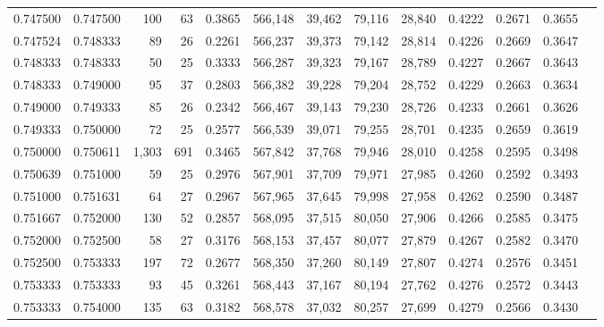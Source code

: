 \begin{tabular}{rrrrrrrrrrrrr}
0.747500 & 0.747500 &   100 &  63 &                                     0.3865 & 566,148 &  39,462 &  79,116 &  28,840 & 0.4222 & 0.2671 & 0.3655 \\
0.747524 & 0.748333 &    89 &  26 &                                     0.2261 & 566,237 &  39,373 &  79,142 &  28,814 & 0.4226 & 0.2669 & 0.3647 \\
0.748333 & 0.748333 &    50 &  25 &                                     0.3333 & 566,287 &  39,323 &  79,167 &  28,789 & 0.4227 & 0.2667 & 0.3643 \\
0.748333 & 0.749000 &    95 &  37 &                                     0.2803 & 566,382 &  39,228 &  79,204 &  28,752 & 0.4229 & 0.2663 & 0.3634 \\
0.749000 & 0.749333 &    85 &  26 &                                     0.2342 & 566,467 &  39,143 &  79,230 &  28,726 & 0.4233 & 0.2661 & 0.3626 \\
0.749333 & 0.750000 &    72 &  25 &                                     0.2577 & 566,539 &  39,071 &  79,255 &  28,701 & 0.4235 & 0.2659 & 0.3619 \\
0.750000 & 0.750611 & 1,303 & 691 &                                     0.3465 & 567,842 &  37,768 &  79,946 &  28,010 & 0.4258 & 0.2595 & 0.3498 \\
0.750639 & 0.751000 &    59 &  25 &                                     0.2976 & 567,901 &  37,709 &  79,971 &  27,985 & 0.4260 & 0.2592 & 0.3493 \\
0.751000 & 0.751631 &    64 &  27 &                                     0.2967 & 567,965 &  37,645 &  79,998 &  27,958 & 0.4262 & 0.2590 & 0.3487 \\
0.751667 & 0.752000 &   130 &  52 &                                     0.2857 & 568,095 &  37,515 &  80,050 &  27,906 & 0.4266 & 0.2585 & 0.3475 \\
0.752000 & 0.752500 &    58 &  27 &                                     0.3176 & 568,153 &  37,457 &  80,077 &  27,879 & 0.4267 & 0.2582 & 0.3470 \\
0.752500 & 0.753333 &   197 &  72 &                                     0.2677 & 568,350 &  37,260 &  80,149 &  27,807 & 0.4274 & 0.2576 & 0.3451 \\
0.753333 & 0.753333 &    93 &  45 &                                     0.3261 & 568,443 &  37,167 &  80,194 &  27,762 & 0.4276 & 0.2572 & 0.3443 \\
0.753333 & 0.754000 &   135 &  63 &                                     0.3182 & 568,578 &  37,032 &  80,257 &  27,699 & 0.4279 & 0.2566 & 0.3430 \\

\end{tabular}
